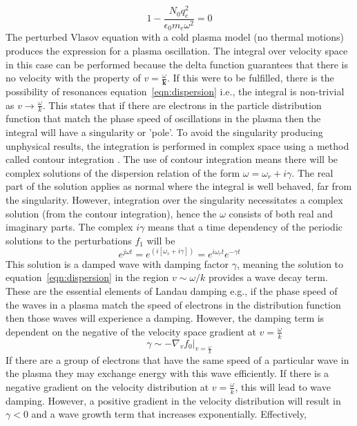 \begin{equation}
1 - \frac{N_0q_e^2}{\epsilon_0 m_e \omega^2} = 0 
\end{equation}
The perturbed Vlasov equation with a cold plasma model (no thermal motions) produces the expression for a plasma oscillation. The integral over velocity space in this case can be performed because the delta function guarantees that there is no velocity with the property of $v = \frac{\omega}{\mathbf{k}}$. If this were to be fulfilled, there is the possibility of resonances equation~\ref{eqn:dispersion} i.e., the integral is non-trivial as $v \rightarrow \frac{\omega}{k}$. This states that if there are electrons in the particle distribution function that match the phase speed of oscillations in the plasma then the integral will have a singularity or 'pole'. To avoid the singularity producing unphysical results, the integration is performed in complex space using a method called contour integration \citep{melrose1989}. The use of contour integration means there will be complex solutions of the dispersion relation of the form $\omega = \omega_r + i\gamma$.
The real part of the solution applies as normal where the integral is well behaved, far from the singularity. However, integration over the singularity necessitates a complex solution (from the contour integration), hence the $\omega$ consists of both real and imaginary parts.
The complex $i\gamma$ means that a time dependency of the periodic solutions to the perturbations $f_1$ will be 
\begin{equation}
e^{j\omega t}=e^{(i[\omega_r + i\gamma])}=e^{i\omega_rt}e^{-\gamma t}
\end{equation}
This solution is a damped wave with damping factor $\gamma$, meaning the solution to equation~\ref{eqn:dispersion} in the region $v \sim \omega/k$ provides a wave decay term. These are the essential elements of Landau damping e.g., if the phase speed of the waves in a plasma match the speed of electrons in the distribution function then those waves will experience a damping. However, the damping term is dependent on the negative of the velocity space gradient at $v=\frac{\omega}{k}$ \citep{melrose1989}
\begin{equation}
\gamma \sim -\nabla_v f_0|_{v=\frac{\omega}{k}}
\end{equation}
If there are a group of electrons that have the same speed of a particular wave in the plasma they may exchange energy with this wave efficiently. If there is a negative gradient on the velocity distribution at $v=\frac{\omega}{k}$, this will lead to wave damping. However, a positive gradient in the velocity distribution will result in $\gamma <0$ and a wave growth term that increases exponentially. Effectively, %
